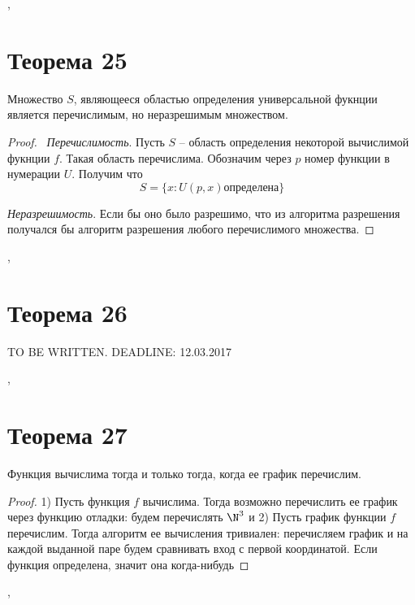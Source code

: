 \documentclass[a4paper,12pt]{article}
\begin{document}
\sep
    \section{Теорема 25}
    \begin{theorem}
        Множество $S$, являющееся областью определения универсальной фукнции является перечислимым, но неразрешимым множеством.
    \end{theorem}
    \begin{proof}
        \
        \textit{Перечислимость}. Пусть $S$ -- область определения некоторой вычислимой фукнции $f$. Такая область перечислима. Обозначим через $p$ номер функции в нумерации $U$. Получим что
        \[
        S = \{x : U(p, x) \text{определена}\}
        \]
        
        \textit{Неразрешимость}. Если бы оно было разрешимо, что из алгоритма разрешения получался бы алгоритм разрешения любого перечислимого множества.
    \end{proof}
    
    \sep
    \section{Теорема 26}
    TO BE WRITTEN. DEADLINE: 12.03.2017
    
    \sep
	\section{Теорема 27}
    \begin{theorem}
        Функция вычислима тогда и только тогда, когда ее график перечислим.
    \end{theorem}
    
    \begin{proof}
        1) Пусть функция $f$ вычислима. Тогда возможно перечислить ее график через функцию отладки: будем перечислять $\N^3$ и
        2) Пусть график функции $f$ перечислим. Тогда алгоритм ее вычисления тривиален: перечисляем график и на каждой выданной паре будем сравнивать вход с первой координатой. Если функция определена, значит она когда-нибудь 
    \end{proof}
    
    	\sep
    
\end{document}
